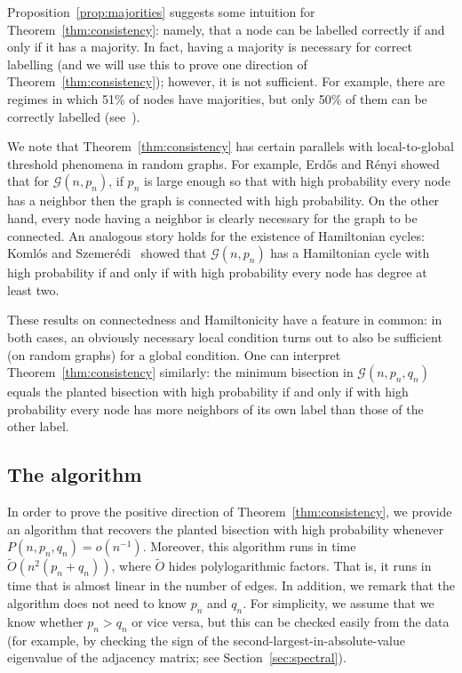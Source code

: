 \documentclass[EJP,final]{ejpecp}
\newcommand{\1}[1]{\mathbbm{1}_{\{#1\}}}
\newcommand{\calG}{\mathcal{G}}
\begin{document}
Proposition~\ref{prop:majorities} suggests some intuition
for Theorem~\ref{thm:consistency}: namely, that a node can be labelled
correctly if and only if it has a majority.
In fact, having a majority is necessary for correct labelling
(and we will use this to prove one direction of Theorem~\ref{thm:consistency});
however, it is not sufficient. For example, there are regimes in which
51\% of nodes have majorities, but only 50\% of them can be correctly labelled
(see~\cite{MoNeSl:13}).

We note that Theorem~\ref{thm:consistency} has certain
parallels with local-to-global threshold phenomena in random graphs. For example,
Erd\H{o}s and R\'enyi showed~\cite{ErdosRenyi:61} that for $\calG(n, p_n)$,
if $p_n$ is large enough so that with high probability every node has a neighbor
then the graph is connected with high probability. On the other hand,
every node having a neighbor is clearly necessary for the graph to be
connected. An analogous story holds for the existence of Hamiltonian cycles:
Koml\'os and Szemer\'edi~\cite{KomlosSzemeredi:83} showed that $\calG(n, p_n)$
has a Hamiltonian cycle with high probability if and only if with high probability
every node has degree at least two.

These results on connectedness and Hamiltonicity have a feature in common: in both
cases, an obviously necessary local condition turns out to also be sufficient (on
random graphs) for a global condition.
One can interpret Theorem~\ref{thm:consistency} similarly:
the minimum bisection in $\calG(n, p_n, q_n)$ equals the planted bisection with high
probability
if and only if with high probability every node
has more neighbors of its own label than those of the other label.

\subsection{The algorithm}
In order to prove the positive direction of Theorem~\ref{thm:consistency},
we provide an algorithm that recovers the planted bisection
with high probability whenever $P(n, p_n, q_n) = o(n^{-1})$.
Moreover, this algorithm runs in time $\tilde O(n^2 (p_n + q_n))$, where $\tilde O$ hides
polylogarithmic factors. That is, it runs in time that is almost linear in the number
of edges. In addition, we remark that the algorithm does not need to know $p_n$ and $q_n$.
For simplicity, we assume that we know whether $p_n > q_n$ or vice versa, but this can be checked
easily from the data (for example, by checking the sign of the second-largest-in-absolute-value
eigenvalue of the adjacency matrix; see Section~\ref{sec:spectral}).
\end{document}
